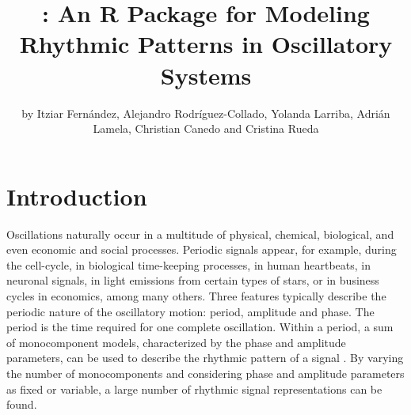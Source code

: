 \title{: An R Package for Modeling Rhythmic Patterns in Oscillatory Systems}
\author{by Itziar Fern\'andez, Alejandro Rodr\'iguez-Collado, Yolanda Larriba, Adri\'an Lamela, Christian Canedo and Cristina Rueda}

\maketitle




\section{Introduction} \label{sec:intro}
Oscillations naturally occur in a multitude of physical, chemical, biological, and even economic and social processes. Periodic signals appear, for example, during the cell-cycle, in biological time-keeping processes, in human heartbeats, in neuronal signals, in light emissions from certain types of stars, or in business cycles in economics, among many others. Three features typically describe the periodic nature of the oscillatory motion: period, amplitude and phase. The period is the time required for one complete oscillation. Within a period, a sum of monocomponent models, characterized by the phase and amplitude parameters, can be used to describe the rhythmic pattern of a signal \citep{Boashash:2016}. By varying the number of monocomponents and considering phase and amplitude parameters as fixed or variable, a large number of rhythmic signal representations can be found.

